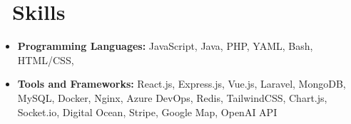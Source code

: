 \documentclass{resume}
\begin{document}



  \section{\faCogs\ Skills}
  \begin{itemize}[parsep=0.5ex]
    \item \textbf{Programming Languages:} JavaScript, Java, PHP, YAML, Bash, HTML/CSS,
    \item \textbf{Tools and Frameworks:} React.js, Express.js, Vue.js, Laravel, MongoDB, MySQL, Docker, Nginx, Azure DevOps, Redis, TailwindCSS, Chart.js, Socket.io, Digital Ocean, Stripe, Google Map, OpenAI API
  \end{itemize}
  
  
\end{document}
